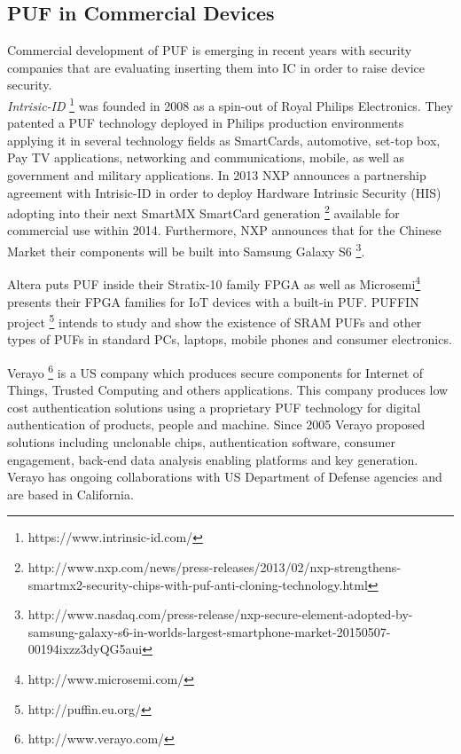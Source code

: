 \documentclass[../tesi.tex]{subfiles}
\begin{document}
\subsection{PUF in Commercial Devices}
Commercial development of PUF is emerging in recent years with security companies that are evaluating inserting them into IC in order to raise device security. \\
\emph{Intrisic-ID} \footnote{https://www.intrinsic-id.com/} was founded in 2008 as a spin-out of Royal Philips Electronics. They patented a PUF technology deployed in Philips production environments applying it in several technology fields as SmartCards, automotive, set-top box, Pay TV applications, networking and communications, mobile, as well as government and military applications.
In 2013 NXP announces a partnership agreement with Intrisic-ID in order to deploy Hardware Intrinsic Security (HIS) adopting  into their next  SmartMX SmartCard generation  \footnote{http://www.nxp.com/news/press-releases/2013/02/nxp-strengthens-smartmx2-security-chips-with-puf-anti-cloning-technology.html} available for commercial use within 2014. Furthermore, NXP announces that for the Chinese Market their components will be built into Samsung Galaxy S6 \footnote{http://www.nasdaq.com/press-release/nxp-secure-element-adopted-by-samsung-galaxy-s6-in-worlds-largest-smartphone-market-20150507-00194ixzz3dyQG5aui}.

Altera puts PUF inside their Stratix-10 family FPGA as well as Microsemi\footnote{http://www.microsemi.com/} presents their FPGA families for IoT devices with a built-in PUF. 
PUFFIN project \footnote{http://puffin.eu.org/} intends to study and show the existence of SRAM PUFs and other types of PUFs in standard PCs, laptops, mobile phones and consumer electronics.

Verayo \footnote{http://www.verayo.com/} is a US company which produces secure components for Internet of Things, Trusted Computing and others applications. This company produces low cost authentication solutions using a proprietary PUF technology for digital authentication of products, people and machine. Since 2005 Verayo proposed solutions including unclonable chips, authentication software, consumer engagement, back-end data analysis enabling platforms and key generation. Verayo has ongoing collaborations with US Department of Defense agencies and are based in California. 
\end{document}

